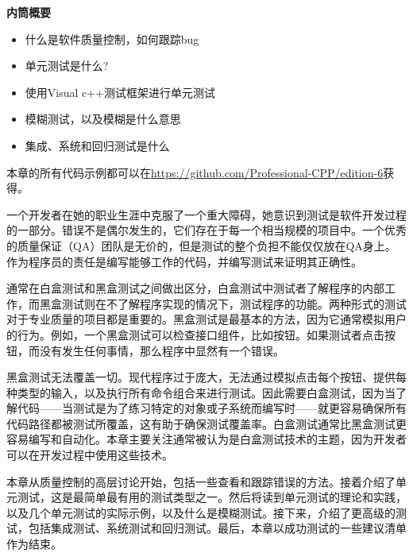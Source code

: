 \noindent
\textbf{内筒概要}

\begin{itemize}
\item
什么是软件质量控制，如何跟踪bug

\item
单元测试是什么?

\item
使用Visual c++测试框架进行单元测试

\item
模糊测试，以及模糊是什么意思

\item
集成、系统和回归测试是什么
\end{itemize}

本章的所有代码示例都可以在\url{https://github.com/Professional-CPP/edition-6}获得。

一个开发者在她的职业生涯中克服了一个重大障碍，她意识到测试是软件开发过程的一部分。错误不是偶尔发生的，它们存在于每一个相当规模的项目中。一个优秀的质量保证（QA）团队是无价的，但是测试的整个负担不能仅仅放在QA身上。作为程序员的责任是编写能够工作的代码，并编写测试来证明其正确性。

通常在白盒测试和黑盒测试之间做出区分，白盒测试中测试者了解程序的内部工作，而黑盒测试则在不了解程序实现的情况下，测试程序的功能。两种形式的测试对于专业质量的项目都是重要的。黑盒测试是最基本的方法，因为它通常模拟用户的行为。例如，一个黑盒测试可以检查接口组件，比如按钮。如果测试者点击按钮，而没有发生任何事情，那么程序中显然有一个错误。

黑盒测试无法覆盖一切。现代程序过于庞大，无法通过模拟点击每个按钮、提供每种类型的输入，以及执行所有命令组合来进行测试。因此需要白盒测试，因为当了解代码——当测试是为了练习特定的对象或子系统而编写时——就更容易确保所有代码路径都被测试所覆盖，这有助于确保测试覆盖率。白盒测试通常比黑盒测试更容易编写和自动化。本章主要关注通常被认为是白盒测试技术的主题，因为开发者可以在开发过程中使用这些技术。

本章从质量控制的高层讨论开始，包括一些查看和跟踪错误的方法。接着介绍了单元测试，这是最简单最有用的测试类型之一。然后将读到单元测试的理论和实践，以及几个单元测试的实际示例，以及什么是模糊测试。接下来，介绍了更高级的测试，包括集成测试、系统测试和回归测试。最后，本章以成功测试的一些建议清单作为结束。
